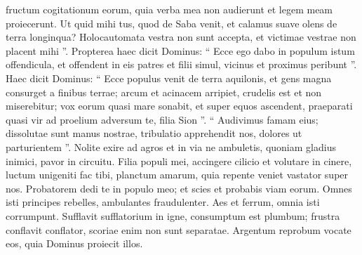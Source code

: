 \begin{biblechapter}
\begin{biblechapter}
\begin{biblechapter}
\begin{biblechapter}
\begin{biblechapter}
\begin{biblechapter}
 fructum cogitationum eorum,
 quia verba mea non audierunt
 et legem meam proiecerunt.
 \verse Ut quid mihi tus, quod de Saba venit,
 et calamus suave olens de terra longinqua?
 Holocautomata vestra non sunt accepta,
 et victimae vestrae non placent mihi ”.
 \verse Propterea haec dicit Dominus:
 “ Ecce ego dabo in populum istum offendicula,
 et offendent in eis patres et filii simul,
 vicinus et proximus peribunt ”.
 \verse Haec dicit Dominus:
 “ Ecce populus venit de terra aquilonis,
 et gens magna consurget a finibus terrae;
 \verse arcum et acinacem arripiet,
 crudelis est et non miserebitur;
 vox eorum quasi mare sonabit,
 et super equos ascendent,
 praeparati quasi vir ad proelium
 adversum te, filia Sion ”.
 \verse “ Audivimus famam eius;
 dissolutae sunt manus nostrae,
 tribulatio apprehendit nos,
 dolores ut parturientem ”.
 \verse Nolite exire ad agros
 et in via ne ambuletis,
 quoniam gladius inimici,
 pavor in circuitu.
 \verse Filia populi mei, accingere cilicio
 et volutare in cinere,
 luctum unigeniti fac tibi,
 planctum amarum,
 quia repente veniet vastator super nos.
 \verse Probatorem dedi te in populo meo;
 et scies et probabis viam eorum.
 \verse Omnes isti principes rebelles,
 ambulantes fraudulenter.
 Aes et ferrum,
 omnia isti corrumpunt.
 \verse Sufflavit sufflatorium in igne,
 consumptum est plumbum;
 frustra conflavit conflator,
 scoriae enim non sunt separatae.
 \verse Argentum reprobum vocate eos,
 quia Dominus proiecit illos.
 

\end{biblechapter}
\end{biblechapter}
\end{biblechapter}
\end{biblechapter}
\end{biblechapter}
\end{biblechapter}
